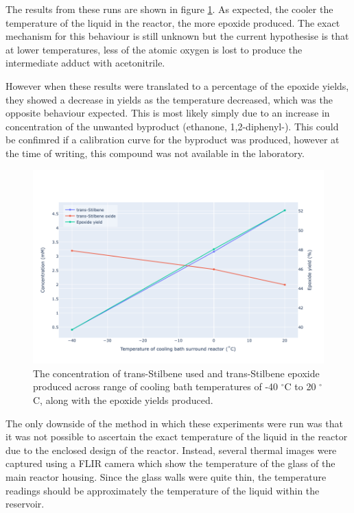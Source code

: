 The results from these runs are shown in figure \ref{fig:temp_ts_tse_concentration}. As expected, the cooler the temperature of the liquid in the reactor, the more epoxide produced. The exact mechanism for this behaviour is still unknown but the current hypothesise is that at lower temperatures, less of the atomic oxygen is lost to produce the intermediate adduct with acetonitrile.

However when these results were translated to a percentage of the epoxide yields, they showed a decrease in yields as the temperature decreased, which was the opposite behaviour expected. This is most likely simply due to an increase in concentration of the unwanted byproduct (ethanone, 1,2-diphenyl-). This could be confimred if a calibration curve for the byproduct was produced, however at the time of writing, this compound was not available in the laboratory.

\begin{figure}[h!]
	\centering
    \includegraphics[width=\linewidth]{chapter_6/figures/temp_ts_tse_concentration.png} 
	\caption{The concentration of trans-Stilbene used and trans-Stilbene epoxide produced across range of cooling bath temperatures of -40 $^{\circ}$C to 20 $^{\circ}$C, along with the epoxide yields produced.}
	\label{fig:temp_ts_tse_concentration}
\end{figure} 

The only downside of the method in which these experiments were run was that it was not possible to ascertain the exact temperature of the liquid in the reactor due to the enclosed design of the reactor. Instead, several thermal images were captured using a FLIR camera which show the temperature of the glass of the main reactor housing. Since the glass walls were quite thin, the temperature readings should be approximately the temperature of the liquid within the reservoir. 

